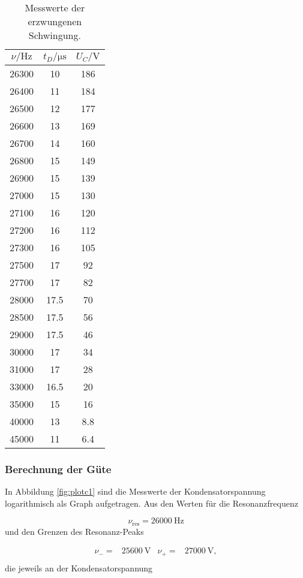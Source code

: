 \begin{table}[h]
  \centering
  \begin{tabular}{c c c}
    \toprule
    $\nu/\si{\hertz}$ & $t_D/\si{\micro\second}$ & $U_C/\si{\volt}$ \\
    \midrule
    26300 & 10 & 186 \\
    26400 & 11 & 184 \\
    26500 & 12 & 177 \\
    26600 & 13 & 169 \\
    26700 & 14 & 160 \\
    26800 & 15 & 149 \\
    26900 & 15 & 139 \\
    27000 & 15 & 130 \\
    27100 & 16 & 120 \\
    27200 & 16 & 112 \\
    27300 & 16 & 105 \\
    27500 & 17 & 92 \\
    27700 & 17 & 82 \\
    28000 & 17.5 & 70 \\
    28500 & 17.5 & 56 \\
    29000 & 17.5 & 46 \\
    30000 & 17 & 34 \\
    31000 & 17 & 28 \\
    33000 & 16.5 & 20 \\
    35000 & 15 & 16 \\
    40000 & 13 & 8.8 \\
    45000 & 11 & 6.4 \\
    \bottomrule
  \end{tabular}
  \caption{Messwerte der erzwungenen Schwingung.}
  \label{tab:Messung3b}
\end{table}


\subsubsection{Berechnung der Güte}

In Abbildung \ref{fig:plotc1} sind
die Messwerte der Kondensatorspannung logarithmisch als Graph aufgetragen.
Aus den Werten für die Resonanzfrequenz

\begin{equation}
  \nu_\text{res} = \SI{26000}{\hertz}
\end{equation}
und den Grenzen des Resonanz-Peaks

\begin{align}
  \nu_- = & \SI{25600}{\V} & \nu_+ = & \SI{27000}{\V}, \\
\end{align}
die jeweils an der Kondensatorspannung

